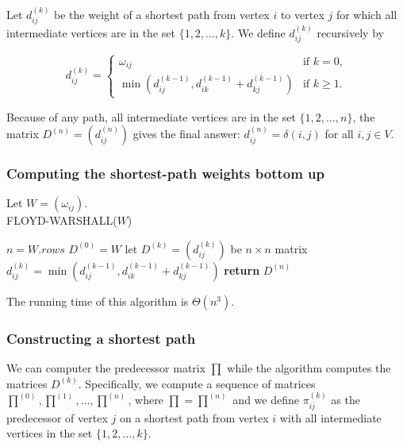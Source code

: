 \documentclass[12pt]{article}
\begin{document}
Let $d_{ij}^{(k)}$ be the weight of a shortest path from vertex $i$ to vertex $j$ for which all intermediate vertices are in the set $\{ 1,2,\dots,k \}$. We define $d_{ij}^{(k)}$ recursively by

\begin{equation*}
  d_{ij}^{(k)} =
  \begin{cases}
    \omega_{ij} & \text{if $k=0$,} \\
    \min (d_{ij}^{(k-1)}, d_{ik}^{(k-1)} + d_{kj}^{(k-1)}) & \text{if $k \ge 1$.}
  \end{cases}
\end{equation*}

Because of any path, all intermediate vertices are in the set $\{ 1,2,\dots,n \}$, the matrix $D^{(n)} = (d_{ij}^(n))$ gives the final answer: $d_{ij}^{(n)} = \delta(i,j)$ for all $i,j \in V$.

\subsubsection*{Computing the shortest-path weights bottom up}

Let $W = (\omega_{ij})$. \\

FLOYD-WARSHALL($W$)
\begin{algorithmic} [1]
\State $n = W.rows$
\State $D^{(0)} = W$
	\State let $D^{(k)} = (d_{ij}^{(k)})$ be $n \times n$ matrix
			\State $d_{ij}^{(k)} = \min (d_{ij}^{(k-1)}, d_{ik}^{(k-1)} + d_{kj}^{(k-1)})$
                \EndFor
        \EndFor
\EndFor
\State \textbf{return } $D^{(n)}$
\end{algorithmic}

The running time of this algorithm is $\Theta(n^3)$.

\subsubsection*{Constructing a shortest path}

We can computer the predecessor matrix $\prod$ while the algorithm computes the matrices $D^{(k)}$. Specifically, we compute a sequence of matrices $\prod^{(0)}, \prod^{(1)}, \dots, \prod^{(n)}$, where $\prod = \prod^{(n)}$ and we define $\pi_{ij}^{(k)}$ as the predecessor of vertex $j$ on a shortest path from vertex $i$ with all intermediate vertices in the set $\{ 1,2, \dots, k \}$. \\
\end{document}
